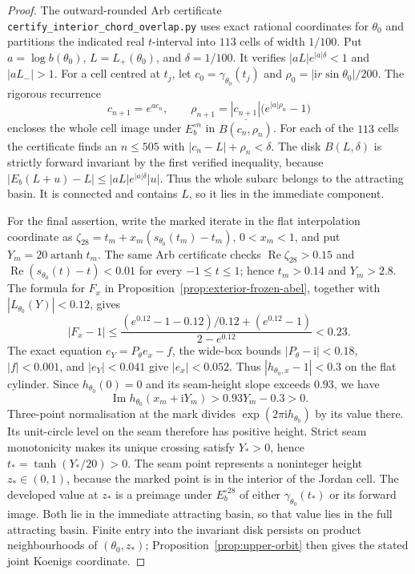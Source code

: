 \documentclass[11pt,a4paper]{article}
\theoremstyle{definition}
\newcommand{\ii}{\mathrm{i}}
\begin{document}
\begin{proof}
The outward-rounded Arb certificate
\texttt{certify\_interior\_chord\_overlap.py} uses exact rational
coordinates for $\theta_0$ and partitions the indicated real
$t$-interval into $113$ cells of width $1/100$.  Put
$a=\log b(\theta_0)$, $L=L_+(\theta_0)$, and $\delta=1/100$.
It verifies $|aL|e^{|a|\delta}<1$ and $|aL_-|>1$.
For a cell centred at $t_j$, let
$c_0=\gamma_{\theta_0}(t_j)$ and
$\rho_0=|\ii r\sin\theta_0|/200$.
The rigorous recurrence
\[
 c_{n+1}=e^{a c_n},\qquad
 \rho_{n+1}=|c_{n+1}|\bigl(e^{|a|\rho_n}-1\bigr)
\]
encloses the whole cell image under $E_b^{\circ n}$ in
$\overline{B(c_n,\rho_n)}$.  For each of the $113$ cells the
certificate finds an $n\le505$ with
$|c_n-L|+\rho_n<\delta$.
The disk $B(L,\delta)$ is strictly forward invariant by the
first verified inequality, because
$|E_b(L+u)-L|\le|aL|e^{|a|\delta}|u|$.
Thus the whole subarc belongs to the attracting basin.
It is connected and contains $L$, so it lies in the immediate
component.

For the final assertion, write the marked iterate in the flat
interpolation coordinate as
$\zeta_{28}=t_m+x_m(s_{\theta_0}(t_m)-t_m)$,
$0<x_m<1$, and put $Y_m=20\operatorname{artanh}t_m$.
The same Arb certificate checks
$\operatorname{Re}\zeta_{28}>0.15$ and
$\operatorname{Re}(s_{\theta_0}(t)-t)<0.01$ for every
$-1\le t\le1$; hence $t_m>0.14$ and $Y_m>2.8$.
The formula for $F_x$ in
Proposition~\ref{prop:exterior-frozen-abel}, together with
$|L_{\theta_0}(Y)|<0.12$, gives
\[
 |F_x-1|\le
 \frac{(e^{0.12}-1-0.12)/0.12+(e^{0.12}-1)}{2-e^{0.12}}
 <0.23.
\]
The exact equation $e_Y=P_\theta e_x-f$, the wide-box bounds
$|P_\theta-\ii|<0.18$, $|f|<0.001$, and
$|e_Y|<0.041$ give $|e_x|<0.052$.  Thus
$|h_{\theta_0,x}-1|<0.3$ on the flat cylinder.
Since $h_{\theta_0}(0)=0$ and its seam-height slope exceeds
$0.93$, we have
\[
 \operatorname{Im}h_{\theta_0}(x_m+\ii Y_m)
 >0.93Y_m-0.3>0.
\]
Three-point normalisation at the mark divides
$\exp(2\pi\ii h_{\theta_0})$ by its value there.
Its unit-circle level on the seam therefore has positive height.
Strict seam monotonicity makes its unique crossing satisfy
$Y_*>0$, hence $t_*=\tanh(Y_*/20)>0$.
The seam point represents a noninteger height $z_*\in(0,1)$,
because the marked point is in the interior of the Jordan cell.
The developed value at $z_*$ is a preimage under
$E_b^{\circ28}$ of either $\gamma_{\theta_0}(t_*)$ or its
forward image.  Both lie in the immediate attracting basin, so
that value lies in the full attracting basin.  Finite entry into
the invariant disk persists on product neighbourhoods of
$(\theta_0,z_*)$; Proposition~\ref{prop:upper-orbit} then gives
the stated joint Koenigs coordinate.
\end{proof}
\end{document}

